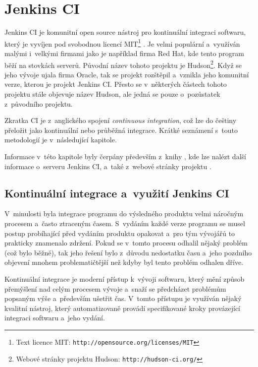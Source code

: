     \section {Jenkins CI} \label{jenkins}
        Jenkins CI je komunitní open source nástroj pro kontinuální integraci softwaru, který je vyvíjen pod svobodnou licencí
        MIT\footnote{Text licence MIT: \texttt{http://opensource.org/licenses/MIT}} \cite{jenkinsGovernance}.
        Je velmi populární a~využíván malými i~velkými firmami jako je například firma Red Hat, kde tento program běží na stovkách serverů.
        Původní název tohoto projektu je Hudson\footnote{Webové stránky projektu Hudson: \texttt{http://hudson-ci.org/}}. 
        Když se jeho vývoje ujala firma Oracle, tak se projekt
        rozštěpil a~vznikla jeho komunitní verze, kterou je projekt Jenkins CI. Přesto se v~některých částech tohoto projektu 
        stále objevuje název Hudson, ale jedná se pouze o~pozůstatek z~původního projektu.

        Zkratka CI je z~anglického spojení \emph{continuous integration}, což lze do češtiny přeložit jako kontinuální nebo průběžná 
        integrace. Krátké seznámení s~touto metodologií je v~následující kapitole.

        Informace v~této kapitole byly čerpány především  z~knihy \cite{jenkinsBook}, kde lze nalézt další informace o~serveru Jenkins CI,
        a~také z~webové stránky projektu \cite{jenkinsWeb}.

        \subsection{Kontinuální integrace a~využití Jenkins CI}
            V~minulosti byla integrace programu do výsledného produktu velmi náročným procesem a~často ztraceným časem.
            S~vydáním každé verze programu se musel postup probíhající před vydáním produktu opakovat a~pro tým vývojářů
            to prakticky znamenalo zdržení. Pokud se v~tomto procesu odhalil nějaký problém (což bylo běžné),
            tak jeho řešení bylo z~důvodu nedostatku času a~jeho pozdního objevení mnohem problematičtější
            než kdyby byl tento problém odhalen dříve.

            Kontinuální integrace je moderní přístup k~vývoji softwaru, který mění způsob přemýšlení nad celým procesem vývoje
            a~snaží se předcházet problémům popsaným výše a~především ušetřit čas. V~tomto přístupu je využíván nějaký
            kvalitní nástroj, který automatizovaně provádí specifikované kroky provázející integraci softwaru a~jeho vydání.

